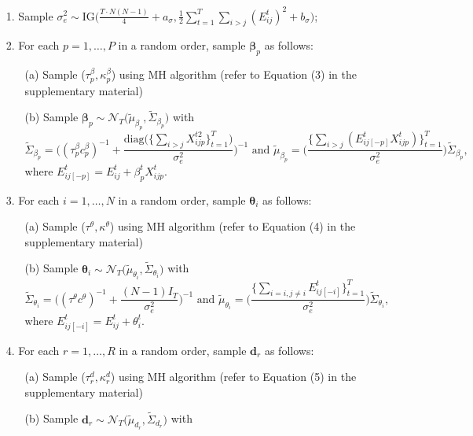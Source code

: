 \documentclass[a4paper]{article}
\begin{document}
	\begin{itemize}
		\item [1.] Sample $\sigma_e^2 \sim \mbox{IG}\big(\frac{T\cdot N(N-1)}{4}+a_\sigma, \frac{1}{2}\sum\limits_{t=1}^T\sum\limits_{i> j}(E^t_{ij})^2 + b_\sigma\big)$;
		\item [2.] For each $p = 1,\ldots,P$ in a random order, sample $\boldsymbol{\beta}_{p}$ as follows:
		\begin{enumerate} 
			\item [(a)] Sample ($\tau^{\beta}_p ,\kappa^\beta_p$) using MH algorithm (refer to Equation (3) in the supplementary material)
			\item [(b)] Sample $\boldsymbol{\beta}_{p} \sim \mathcal{N}_T\big(\tilde{\mu}_{\beta_p}, \tilde{\Sigma}_{\beta_p} \big)$ with 
			$$\tilde{\Sigma}_{\beta_p} = \Big((\tau^{\beta}_pc^\beta_p)^{-1}+\frac{\mbox{diag}\big(\{\sum_{i>j}{X^{t2}_{ijp}}\}_{t=1}^{T}\big)}{\sigma_e^2}\Big)^{-1} \mbox{ and } \tilde{\mu}_{\beta_p} =  \Big(\frac{\{\sum_{i>j}(E^{t}_{ij[-p]}X^t_{ijp})\}_{t=1}^{T}}{\sigma_e^2}\Big)\tilde{\Sigma}_{\beta_p},$$ 
			where $E^{t}_{ij[-p]}=E^t_{ij}+\beta^t_{p}X^{t}_{ijp}$.						
		\end{enumerate}
		\item [3.] For each $i= 1,\ldots,N$ in a random order, sample $\boldsymbol{\theta}_{i}$ as follows:
		\begin{enumerate}
			\item [(a)] Sample ($\tau^{\theta},  \kappa^\theta$) using MH algorithm (refer to Equation (4) in the supplementary material)
			\item [(b)] Sample $\boldsymbol{\theta}_{i} \sim \mathcal{N}_T\big(\tilde{\mu}_{\theta_i}, \tilde{\Sigma}_{\theta_i} \big)$ with
			$$\tilde{\Sigma}_{\theta_i} = \Big((\tau^\theta c^\theta)^{-1}+\frac{(N-1)I_T}{\sigma_e^2}\Big)^{-1} \mbox{ and }
			\tilde{\mu}_{\theta_i} = \Big(\frac{\{\sum_{i=i, j\neq i}E^{t}_{ij[-i]}\}_{t=1}^{T}}{\sigma_e^2}\Big)\tilde{\Sigma}_{\theta_i},$$ where $E^{t}_{ij[-i]}=E^t_{ij}+\theta^t_{i}.$
		\end{enumerate}
		\item [4.] For each $r =1,\ldots,R$ in a random order, sample $\boldsymbol{d}_{r}$ as follows:
		\begin{enumerate}
			\item [(a)] Sample  ($\tau_r^{d},  \kappa_r^d$) using MH algorithm (refer to Equation (5) in the supplementary material)
			\item [(b)] Sample $\boldsymbol{d}_{r} \sim \mathcal{N}_T\big(\tilde{\mu}_{d_r}, \tilde{\Sigma}_{d_r} \big)$ with

\end{enumerate}
\end{itemize}
\end{document}
